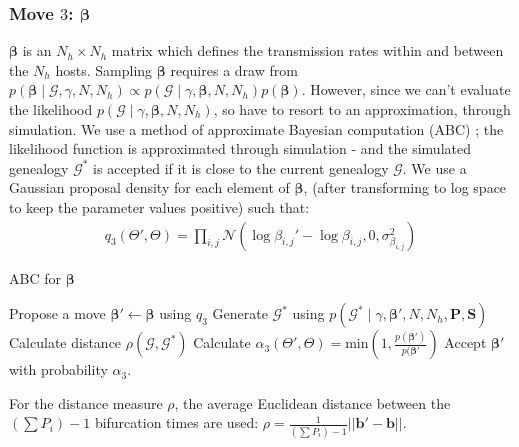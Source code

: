 \documentclass[]{report}
\begin{document}
\subsubsection{Move $3$: $\boldsymbol\beta$}
$\boldsymbol\beta$ is an $N_h \times N_h$ matrix which defines the transmission rates within and between the $N_h$ hosts. Sampling $\boldsymbol\beta$ requires a draw from $p(\boldsymbol{\beta}\mid\mathcal{G},\gamma,N,N_h)\propto p(\mathcal{G}\mid\gamma, \boldsymbol{\beta},N,N_h)p(\boldsymbol{\beta})$. However, since we can't evaluate the likelihood $p(\mathcal{G}\mid\gamma, \boldsymbol{\beta},N,N_h)$, so have to resort to an approximation, through simulation. We use a method of approximate Bayesian computation (ABC) ; the likelihood function is approximated through simulation - and the simulated genealogy $\mathcal{G}^*$ is accepted if it is close to the current genealogy $\mathcal{G}$. We use a Gaussian proposal density for each element of $\boldsymbol{\beta}$, (after transforming to log space to keep the parameter values positive) such that:
\begin{eqnarray}
q_3(\Theta',\Theta)=\prod_{i,j} \mathcal{N}(\log \beta_{i,j}' - \log \beta_{i,j}, 0 , \sigma_{\beta_{i,j}}^2)
\end{eqnarray}
\begin{algorithm}
\caption{ABC for $\boldsymbol\beta$ \label{alg:beta}}
\begin{algorithmic}
\STATE Propose a move $\boldsymbol{\beta}'\gets \boldsymbol{\beta}$ using $q_3$
\STATE Generate $\mathcal{G}^*$ using $p(\mathcal{G}^*\mid \gamma, \boldsymbol{\beta}', N, N_h, \mathbf{P}, \mathbf{S})$
\STATE Calculate distance $\rho(\mathcal{G},\mathcal{G}^*)$
\STATE Calculate $\alpha_{3}(\Theta',\Theta)=\textrm{min}\left(1,\frac{p(\boldsymbol{\beta}')}{p(\boldsymbol{\beta}'} \right)$
\STATE Accept $\boldsymbol{\beta}'$ with probability $\alpha_3$.
\ENDIF
\end{algorithmic}
\end{algorithm}
For the distance measure $\rho$, the average Euclidean distance between the $(\sum P_i) -1$ bifurcation times are used: $\rho = \frac{1}{(\sum P_i) -1}||\mathbf{b}'-\mathbf{b}||$.
\end{document}
